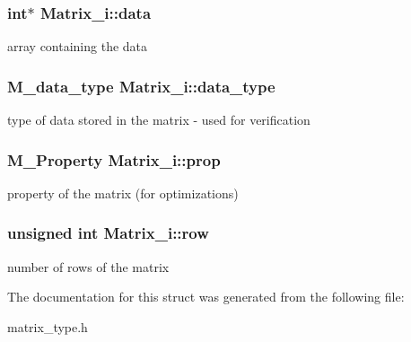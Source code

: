 \subsubsection[{\texorpdfstring{data}{data}}]{\setlength{\rightskip}{0pt plus 5cm}int$\ast$ Matrix\+\_\+i\+::data}\hypertarget{structMatrix__i_a0fe0365ed38d16792c645305c5662f53}{}\label{structMatrix__i_a0fe0365ed38d16792c645305c5662f53}
array containing the data 
\subsubsection[{\texorpdfstring{data\+\_\+type}{data_type}}]{\setlength{\rightskip}{0pt plus 5cm}M\+\_\+data\+\_\+type Matrix\+\_\+i\+::data\+\_\+type}\hypertarget{structMatrix__i_a099b6cf6ea02b60b50fafa042e48c063}{}\label{structMatrix__i_a099b6cf6ea02b60b50fafa042e48c063}
type of data stored in the matrix -\/ used for verification 
\subsubsection[{\texorpdfstring{prop}{prop}}]{\setlength{\rightskip}{0pt plus 5cm}M\+\_\+\+Property Matrix\+\_\+i\+::prop}\hypertarget{structMatrix__i_a8b30ae67887da20fe1d7fdd51ebc3ecb}{}\label{structMatrix__i_a8b30ae67887da20fe1d7fdd51ebc3ecb}
property of the matrix (for optimizations) 
\subsubsection[{\texorpdfstring{row}{row}}]{\setlength{\rightskip}{0pt plus 5cm}unsigned int Matrix\+\_\+i\+::row}\hypertarget{structMatrix__i_a9fc27d070aaebd0e2d7198a62f7b25d6}{}\label{structMatrix__i_a9fc27d070aaebd0e2d7198a62f7b25d6}
number of rows of the matrix 

The documentation for this struct was generated from the following file\+:\begin{DoxyCompactItemize}
\item 
matrix\+\_\+type.\+h\end{DoxyCompactItemize}

